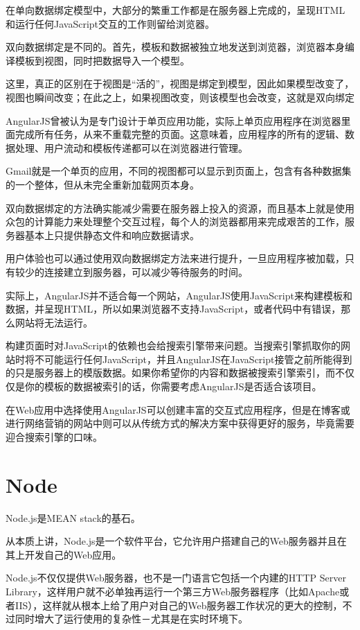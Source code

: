 在单向数据绑定模型中，大部分的繁重工作都是在服务器上完成的，呈现HTML和运行任何JavaScript交互的工作则留给浏览器。

双向数据绑定是不同的。首先，模板和数据被独立地发送到浏览器，浏览器本身编译模板到视图，同时把数据导入一个模型。

这里，真正的区别在于视图是“活的”，视图是绑定到模型，因此如果模型改变了，视图也瞬间改变；在此之上，如果视图改变，则该模型也会改变，这就是双向绑定

AngularJS曾被认为是专门设计于单页应用功能，实际上单页应用程序在浏览器里面完成所有任务，从来不重载完整的页面。这意味着，应用程序的所有的逻辑、数据处理、用户流动和模板传递都可以在浏览器进行管理。

Gmail就是一个单页的应用，不同的视图都可以显示到页面上，包含有各种数据集的一个整体，但从未完全重新加载网页本身。

双向数据绑定的方法确实能减少需要在服务器上投入的资源，而且基本上就是使用众包的计算能力来处理整个交互过程，每个人的浏览器都用来完成艰苦的工作，服务器基本上只提供静态文件和响应数据请求。

用户体验也可以通过使用双向数据绑定方法来进行提升，一旦应用程序被加载，只有较少的连接建立到服务器，可以减少等待服务的时间。

实际上，AngularJS并不适合每一个网站，AngularJS使用JavaScript来构建模板和数据，并呈现HTML，所以如果浏览器不支持JavaScript，或者代码中有错误，那么网站将无法运行。


构建页面时对JavaScript的依赖也会给搜索引擎带来问题。当搜索引擎抓取你的网站时将不可能运行任何JavaScript，并且AngularJS在JavaScript接管之前所能得到的只是服务器上的模版数据。如果你希望你的内容和数据被搜索引擎索引，而不仅仅是你的模板的数据被索引的话，你需要考虑AngularJS是否适合该项目。


在Web应用中选择使用AngularJS可以创建丰富的交互式应用程序，但是在博客或进行网络营销的网站中则可以从传统方式的解决方案中获得更好的服务，毕竟需要迎合搜索引擎的口味。



\section{Node}


Node.js是MEAN stack的基石。

从本质上讲，Node.js是一个软件平台，它允许用户搭建自己的Web服务器并且在其上开发自己的Web应用。

Node.js不仅仅提供Web服务器，也不是一门语言它包括一个内建的HTTP Server Library，这样用户就不必单独再运行一个第三方Web服务器程序（比如Apache或者IIS），这样就从根本上给了用户对自己的Web服务器工作状况的更大的控制，不过同时增大了运行使用的复杂性－尤其是在实时环境下。


